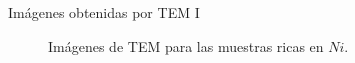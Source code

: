\documentclass[11pt]{beamer}
\begin{document}
			\begin{frame}{Imágenes obtenidas por TEM I}
				 \begin{figure}[H]
				 	\captionsetup[subfloat]{labelformat=empty}
					\centering
					 \qquad
					\caption*{Imágenes de TEM para las muestras ricas en $Ni$.}
					\label{TEMNiRich}
				\end{figure}
			\end{frame}
\end{document}
